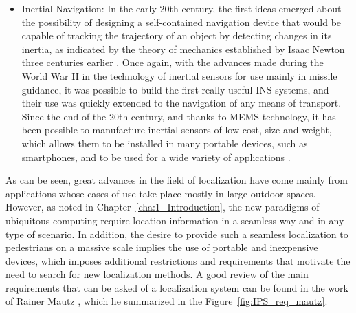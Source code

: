 \begin{itemize}
	\item Inertial Navigation: In the early 20th century, the first ideas emerged about the possibility of designing a self-contained navigation device that would be capable of tracking the trajectory of an object by detecting changes in its inertia, as indicated by the theory of mechanics established by Isaac Newton three centuries earlier \cite{bray_you_2014}.
	Once again, with the advances made during the World War II in the technology of inertial sensors for use mainly in missile guidance, it was possible to build the first really useful INS systems, and their use was quickly extended to the navigation of any means of transport. Since the end of the 20th century, and thanks to MEMS technology, it has been possible to manufacture inertial sensors of low cost, size and weight, which allows them to be installed in many portable devices, such as smartphones, and to be used for a wide variety of applications \cite{grewal_global_2001,titterton_strapdown_2004, walter_history_2007}.
\end{itemize}
		
As can be seen, great advances in the field of localization have come mainly from applications whose cases of use take place mostly in large outdoor spaces.
However, as noted in Chapter~\ref{cha:1_Introduction}, the new paradigms of ubiquitous computing require location information in a seamless way and in any type of scenario.
In addition, the desire to provide such a seamless localization to pedestrians on a massive scale implies the use of portable and inexpensive devices, which imposes additional restrictions and requirements that motivate the need to search for new localization methods. 
A good review of the main requirements that can be asked of a localization system can be found in the work of Rainer Mautz \cite{mautz_rainer_indoor_2012}, which he summarized in the Figure~\ref{fig:IPS_req_mautz}.

